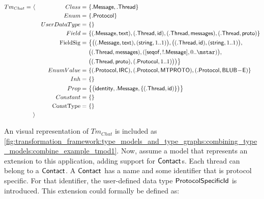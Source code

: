 \begin{align*}
Tm_{Chat} =\ &\langle&
Class =\ &\{ \type{.Message}, \type{.Thread} \} \\&&
Enum =\ &\{ \type{.Protocol} \} \\&&
UserDataType =\ &\{\} \\&&
Field =\ &\{
( \type{.Message}, \type{text} ), 
( \type{.Thread}, \type{id} ), 
( \type{.Thread}, \type{messages} ), 
( \type{.Thread}, \type{proto} )\} \\&&
\mathrm{FieldSig} =\ &\big\{
\big( ( \type{.Message}, \type{text} ), ( \type{string}, 1..1 ) \big), \big( ( \type{.Thread}, \type{id} ), ( \type{string}, 1..1 ) \big),\\&&& 
\big( ( \type{.Thread}, \type{messages} ), ( [ \type{seqof}, !\type{.Message} ], 0..\mstar ) \big),\\&&& 
\big( ( \type{.Thread}, \type{proto} ), ( \type{.Protocol}, 1..1 ) \big) \big)
\big\} \\&&
EnumValue =\ &\{
( \type{.Protocol}, \type{IRC} ), 
( \type{.Protocol}, \type{MTPROTO} ), 
( \type{.Protocol}, \type{BLUB\!-\!E} )\} \\&&
Inh =\ &\{\} \\&&
Prop =\ &\big\{
\big( \type{identity}, \type{.Message}, \{( \type{.Thread}, \type{id} )\} \big)
\big\} \\&&
Constant =\ &\{\} \\&&
\mathrm{ConstType} =\ &\{\}
\\&\rangle
\end{align*}

An visual representation of $Tm_{Chat}$ is included as  \cref{fig:transformation_framework:type_models_and_type_graphs:combining_type_models:combine_example_tmod1}. Now, assume a model that represents an extension to this application, adding support for $\mathsf{Contact}$s. Each thread can belong to a $\mathsf{Contact}$. A $\mathsf{Contact}$ has a name and some identifier that is protocol specific. For that identifier, the user-defined data type $\mathsf{ProtocolSpecificId}$ is introduced. This extension could formally be defined as:

